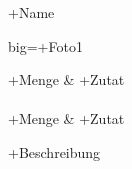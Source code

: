 \newpage

\begin{recipe}
[ %
    bakingtime={+Backzeit},
    bakingtemperature={+Temperatur \textcelcius}, %
]
{+Name}
    
    \graph
    {%
    
	    big=+Foto1 		%

    }
    
    \ingredients
    {%
	    +Menge & +Zutat \\
		\ \\ 					%
		+Menge & +Zutat \\
    }
    
        
    
    
    \preparation
    { %
        +Beschreibung 
    }
    

\end{recipe}
